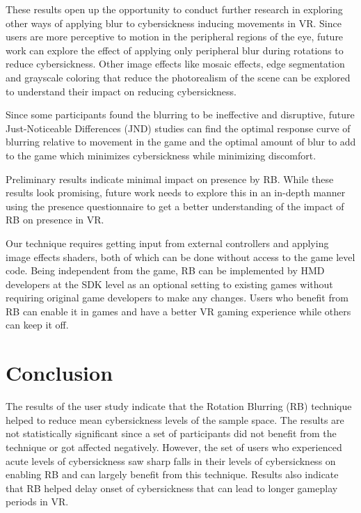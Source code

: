 \documentclass{vgtc}                          %
\begin{document}
These results open up the opportunity to conduct further research in exploring other ways of applying blur to cybersickness inducing movements in VR. Since users are more perceptive to motion in the peripheral regions of the eye, future work can explore the effect of applying only peripheral blur during rotations to reduce cybersickness. Other image effects like mosaic effects, edge segmentation and grayscale coloring that reduce the photorealism of the scene can be explored to understand their impact on reducing cybersickness.

Since some participants found the blurring to be ineffective and disruptive, future Just-Noticeable Differences (JND) studies can find the optimal response curve of blurring relative to movement in the game and the optimal amount of blur to add to the game which minimizes cybersickness while minimizing discomfort.

Preliminary results indicate minimal impact on presence by RB. While these results look promising, future work needs to explore this in an in-depth manner using the presence questionnaire to get a better understanding of the impact of RB on presence in VR. 

Our technique requires getting input from external controllers and applying image effects shaders, both of which can be done without access to the game level code. Being independent from the game, RB can be implemented by HMD developers at the SDK level as an optional setting to existing games without requiring original game developers to make any changes. Users who benefit from RB can enable it in games and have a better VR gaming experience while others can keep it off.

\section {Conclusion}


The results of the user study indicate that the Rotation Blurring (RB) technique helped to reduce mean cybersickness levels of the sample space. The results are not statistically significant since a set of participants did not benefit from the technique or got affected negatively. However, the set of users who experienced acute levels of cybersickness saw sharp falls in their levels of cybersickness on enabling RB and can largely benefit from this technique. Results also indicate that RB helped delay onset of cybersickness that can lead to longer gameplay periods in VR.
\end{document}

